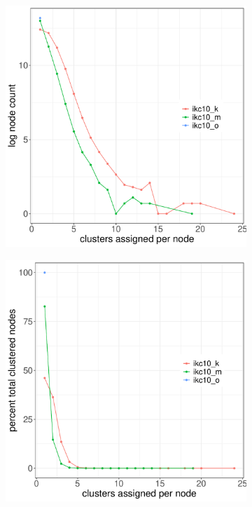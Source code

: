 \documentclass[12pt, oneside]{article}   	%
\begin{document}
\begin{figure}[H]
	\centering
	\begin{subfigure}[t]{0.48\textwidth}
	 \centering
	 \includegraphics[width=\linewidth]{fig2a.pdf} 
	 \end{subfigure}
 \hfill
	\begin{subfigure}[t]{0.48\textwidth}
        \centering
        \includegraphics[width=\linewidth]{fig2b.pdf} 

\end{subfigure}
\end{figure}
\end{document}
